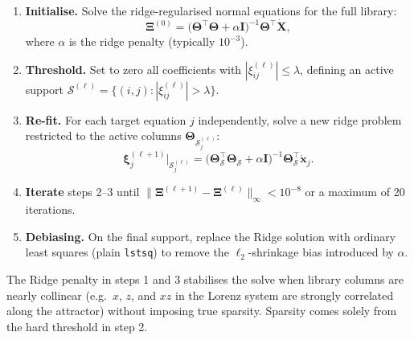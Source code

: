 \documentclass[12pt]{article}
\begin{document}
\begin{enumerate}
  \item \textbf{Initialise.}  Solve the ridge-regularised normal equations
    for the full library:
    \begin{equation}
      \boldsymbol{\Xi}^{(0)} =
      \bigl(\boldsymbol{\Theta}^{\top}\boldsymbol{\Theta}
            + \alpha\mathbf{I}\bigr)^{-1}
      \boldsymbol{\Theta}^{\top}\dot{\mathbf{X}},
      \label{eq:ridge-init}
    \end{equation}
    where $\alpha$ is the ridge penalty (typically $10^{-3}$).

  \item \textbf{Threshold.}  Set to zero all coefficients with
    $|\xi^{(\ell)}_{ij}| \leq \lambda$, defining an active support
    $\mathcal{S}^{(\ell)} = \{(i,j) : |\xi^{(\ell)}_{ij}| > \lambda\}$.

  \item \textbf{Re-fit.}  For each target equation $j$ independently,
    solve a new ridge problem restricted to the active columns
    $\boldsymbol{\Theta}_{\mathcal{S}^{(\ell)}_j}$:
    \begin{equation}
      \boldsymbol{\xi}^{(\ell+1)}_{j}
      \big|_{\mathcal{S}^{(\ell)}_j}
      =
      \bigl(\boldsymbol{\Theta}_{\mathcal{S}}^{\top}
             \boldsymbol{\Theta}_{\mathcal{S}}
            + \alpha\mathbf{I}\bigr)^{-1}
      \boldsymbol{\Theta}_{\mathcal{S}}^{\top}
      \dot{\mathbf{x}}_{j}.
      \label{eq:stlsq-refit}
    \end{equation}

  \item \textbf{Iterate} steps 2--3 until
    $\|\boldsymbol{\Xi}^{(\ell+1)} - \boldsymbol{\Xi}^{(\ell)}\|_{\infty}
    < 10^{-8}$ or a maximum of 20 iterations.

  \item \textbf{Debiasing.}  On the final support, replace the Ridge solution
    with ordinary least squares (plain \texttt{lstsq}) to remove the
    $\ell_{2}$-shrinkage bias introduced by $\alpha$.
\end{enumerate}

The Ridge penalty in steps 1 and 3 stabilises the solve when library columns
are nearly collinear (e.g.\ $x$, $z$, and $xz$ in the Lorenz system are
strongly correlated along the attractor) without imposing true sparsity.
Sparsity comes solely from the hard threshold in step 2.
\end{document}
